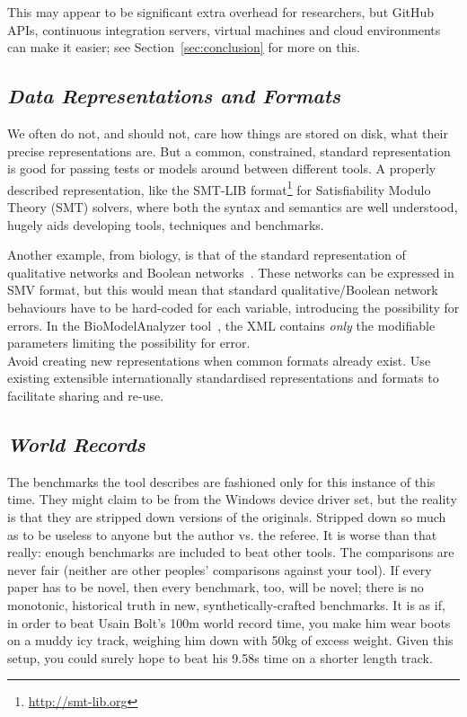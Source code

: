 \documentclass[a4paper,11pt]{article}
\begin{document}
This may appear to be significant extra overhead for researchers, but
GitHub APIs, continuous integration servers, virtual machines and
cloud environments can make it easier; see
Section~\ref{sec:conclusion} for more on this.


\subsection{{\emph{Data Representations and Formats}}}

We often do not, and should not, care how things are stored on disk,
what their precise representations are. But a common, constrained,
standard representation is good for passing tests or models around
between different tools. A properly described representation, like the
SMT-LIB format\footnote{\url{http://smt-lib.org}} for Satisfiability
Modulo Theory (SMT) solvers, where both the syntax and semantics are
well understood, hugely aids developing tools, techniques and
benchmarks.

Another example, from biology, is that of the standard representation
of qualitative networks and Boolean
networks~\cite{Kauffman1969,Schaub2007}.  These networks can be
expressed in SMV format, but this would mean that standard
qualitative/Boolean network behaviours have to be hard-coded for each
variable, introducing the possibility for errors. In the
BioModelAnalyzer tool~\cite{Benque2012}, the XML contains \emph{only}
the modifiable parameters limiting the possibility for error.\\

 Avoid creating
new representations when common formats already exist. Use existing
extensible internationally standardised representations and formats to
facilitate sharing and re-use.

\subsection{{\emph{World Records}}}

The benchmarks the tool describes are fashioned only for this instance
of this time. They might claim to be from the Windows device driver
set, but the reality is that they are stripped down versions of the
originals. Stripped down so much as to be useless to anyone but the
author vs. the referee. It is worse than that really: enough
benchmarks are included to beat other tools. The comparisons are never
fair (neither are other peoples' comparisons against your tool). If
every paper has to be novel, then every benchmark, too, will be novel;
there is no monotonic, historical truth in new, synthetically-crafted
benchmarks. It is as if, in order to beat Usain Bolt's
\num{100}\si{\metre} world record time, you make him wear boots on a
muddy icy track, weighing him down with \num{50}\si{\kilogram} of
excess weight. Given this setup, you could surely hope to beat his
\num{9.58}\si{\second} time on a shorter length track.\\
\end{document}
